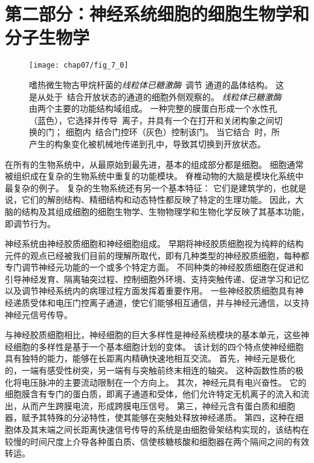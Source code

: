\chapter*{第二部分：神经系统细胞的细胞生物学和分子生物学}

\begin{figure}[htbp]
	\centering
	\texttt{[image: chap07/fig\_7\_0]}
	\caption{嗜热微生物古甲烷杆菌的\textit{线粒体已糖激酶}~调节 通道的晶体结构。
		这是从处于~结合开放状态的通道的细胞外侧观察的。
		\textit{线粒体已糖激酶}由两个主要的功能结构域组成。
		一种完整的膜蛋白形成一个水性孔（蓝色），它选择并传导~离子，并具有一个在打开和关闭构象之间切换的门；
		细胞内~结合门控环（灰色）控制该门。
		当它结合~时，所产生的构象变化被机械地传递到孔中，导致其切换到开放状态。}
	\label{fig:7_0}
\end{figure}





在所有的生物系统中，从最原始到最先进，基本的组成部分都是细胞。
细胞通常被组织成在复杂的生物系统中重复的功能模块。
脊椎动物的大脑是模块化系统中最复杂的例子。
复杂的生物系统还有另一个基本特征：
它们是建筑学的，也就是说，它们的解剖结构、精细结构和动态特性都反映了特定的生理功能。
因此，大脑的结构及其组成细胞的细胞生物学、生物物理学和生物化学反映了其基本功能，即调节行为。


神经系统由神经胶质细胞和神经细胞组成。
早期将神经胶质细胞视为纯粹的结构元件的观点已经被我们目前的理解所取代，即有几种类型的神经胶质细胞，每种都专门调节神经元功能的一个或多个特定方面。
不同种类的神经胶质细胞在促进和引导神经发育、隔离轴突过程、控制细胞外环境、支持突触传递、促进学习和记忆以及调节神经系统内的病理过程方面发挥着重要作用。
一些神经胶质细胞具有神经递质受体和电压门控离子通道，使它们能够相互通信，并与神经元通信，以支持神经元信号传导。


与神经胶质细胞相比，神经细胞的巨大多样性是神经系统模块的基本单元，这些神经细胞的多样性是基于一个基本细胞计划的变体。
该计划的四个特点使神经细胞具有独特的能力，能够在长距离内精确快速地相互交流。
首先，神经元是极化的，一端有感受性树突，另一端有与突触前终末相连的轴突。
这种函数性质的极化将电压脉冲的主要流动限制在一个方向上。
其次，神经元具有电兴奋性。
它的细胞膜含有专门的蛋白质，即离子通道和受体，他们允许特定无机离子的流入和流出，从而产生跨膜电流，形成跨膜电压信号。
第三，神经元含有蛋白质和细胞器，赋予其特殊的分泌特性，使其能够在突触处释放神经递质。
第四，这种在细胞体及其末端之间长距离快速信号传导的系统是由细胞骨架结构实现的，该结构在较慢的时间尺度上介导各种蛋白质、信使核糖核酸和细胞器在两个隔间之间的有效转运。


